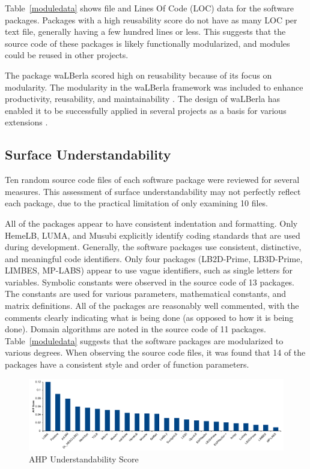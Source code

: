 \documentclass[final, 3p, times, authoryear]{elsarticle}
\begin{document}
Table~\ref{moduledata} shows file and Lines Of Code (LOC) data for the software
packages. Packages with a high reusability score do not have as many LOC per
text file, generally having a few hundred lines or less. This suggests that the
source code of these packages is likely functionally modularized, and modules
could be reused in other projects.

The package waLBerla scored high on reusability because of its focus on
modularity.  The modularity in the waLBerla framework was included to enhance
productivity, reusability, and maintainability \citep{bauer2021walberla}. The
design of waLBerla has enabled it to be successfully applied in several projects
as a basis for various extensions \citep{bauer2021walberla}.

\subsection{Surface Understandability} \label{Sec_SurfUnderstandability}

Ten random source code files of each software package were reviewed for several
measures. This assessment of surface understandability may not perfectly reflect
each package, due to the practical limitation of only examining 10 files. 

All of the packages appear to have consistent indentation and formatting. Only
HemeLB, LUMA, and Musubi explicitly identify coding standards that are used
during development. Generally, the software packages use consistent,
distinctive, and meaningful code identifiers. Only four packages (LB2D-Prime,
LB3D-Prime, LIMBES, MP-LABS) appear to use vague identifiers, such as single
letters for variables. Symbolic constants were observed in the source code of 13
packages. The constants are used for various parameters, mathematical constants,
and matrix definitions. All of the packages are reasonably well commented, with
the comments clearly indicating what is being done (as opposed to how it is
being done). Domain algorithms are noted in the source code of 11 packages.
Table~\ref{moduledata} suggests that the software packages are modularized to
various degrees. When observing the source code files, it was found that 14 of
the packages have a consistent style and order of function parameters.

\begin{figure}[h!]
	\begin{center}
		\includegraphics[width=1.0\textwidth]{./figures/understandability_chart.pdf}
		\caption{AHP Understandability Score}
		\label{Fig_Understandability}
	\end{center}
\end{figure}
\end{document}
